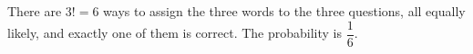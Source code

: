 There are $3!=6$ ways to assign the three words to the three questions, all equally likely, and exactly one of them is correct. The probability is $\boxed{\dfrac{1}{6}}$.
